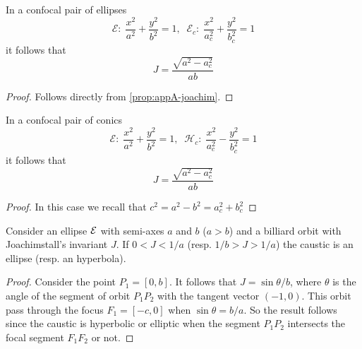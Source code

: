 	\begin{proposition}
	    In a confocal pair of ellipses
	    \[\mathcal{E}:\; \frac{x^2}{a^2}+\frac{y^2}{b^2}=1,\;\; \mathcal{E}_c:\; \frac{x^2}{a_c^2}+\frac{y^2}{b_c^2}=1\]
	    it follows that
	   \[ J  =\frac{\sqrt{  a^2 - a_c^2}}{a b} \]
	      \label{prop:appA-confocal-EE}
	\end{proposition}
	
	\begin{proof} Follows directly from \cref{prop:appA-joachim}.
	    
	\end{proof}
	
	\begin{proposition}
	    In a confocal pair of conics
	    \[\mathcal{E}:\; \frac{x^2}{a^2}+\frac{y^2}{b^2}=1,\;\; \mathcal{H}_c:\; \frac{x^2}{a_c^2}-\frac{y^2}{b_c^2}=1\]
	    it follows that
	     \[ J  =\frac{\sqrt{  a^2 - a_c^2}}{a b} \]
	    \label{prop:appA-confocal-EH}
	\end{proposition}
	
	\begin{proof}
	    In this case we  recall that $c^2=a^2-b^2=a_c^2+b_c^2$
	\end{proof}
	
	\begin{proposition}
	    Consider an ellipse $\mathcal{E}$ with semi-axes $a$ and $b$ \textrm{(}$a>b$\textrm{)} and a billiard orbit with Joachimstall's invariant $J$.
	    If $0<J<1/a$ \textrm{(}resp. $1/b> J> 1/a$\textrm{)} the caustic is an ellipse (resp. an hyperbola).
	\end{proposition}
	
	\begin{proof} Consider the point $P_1=[0,b].$ It follows that
	$J=\sin\theta/b$, where $\theta$ is the angle of the segment of orbit  $P_1P_2$  with the tangent vector $(-1,0)$. This orbit pass through the focus $F_1=[-c,0]$ when $\sin\theta=b/a$. So the result follows since the caustic is   hyperbolic or elliptic when the segment $P_1P_2$ intersects the focal segment $F_1F_2$ or not.  
	    
	\end{proof}